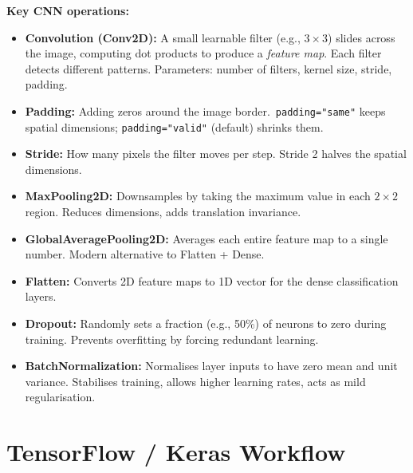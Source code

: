 \documentclass[12pt, a4paper, oneside]{book}
\begin{document}
\textbf{Key CNN operations:}
\begin{itemize}[leftmargin=2em]
    \item \textbf{Convolution (Conv2D):} A small learnable filter (e.g., $3 \times 3$) slides across the image, computing dot products to produce a \emph{feature map}. Each filter detects different patterns. Parameters: number of filters, kernel size, stride, padding.
    \item \textbf{Padding:} Adding zeros around the image border.\ \texttt{padding="same"} keeps spatial dimensions; \texttt{padding="valid"} (default) shrinks them.
    \item \textbf{Stride:} How many pixels the filter moves per step. Stride 2 halves the spatial dimensions.
    \item \textbf{MaxPooling2D:} Downsamples by taking the maximum value in each $2\times2$ region. Reduces dimensions, adds translation invariance.
    \item \textbf{GlobalAveragePooling2D:} Averages each entire feature map to a single number. Modern alternative to Flatten + Dense.
    \item \textbf{Flatten:} Converts 2D feature maps to 1D vector for the dense classification layers.
    \item \textbf{Dropout:} Randomly sets a fraction (e.g., 50\%) of neurons to zero during training. Prevents overfitting by forcing redundant learning.
    \item \textbf{BatchNormalization:} Normalises layer inputs to have zero mean and unit variance. Stabilises training, allows higher learning rates, acts as mild regularisation.
\end{itemize}

\section{TensorFlow / Keras Workflow}
\end{document}
